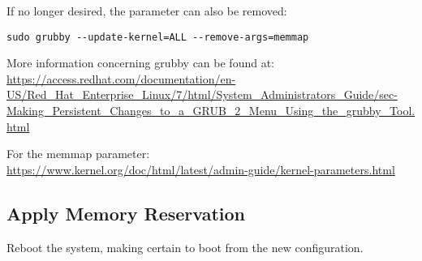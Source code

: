 \begin{flushleft}
If no longer desired, the parameter can also be removed:
\begin{lstlisting}
sudo grubby --update-kernel=ALL --remove-args=memmap
\end{lstlisting}

More information concerning grubby can be found at:\\
\url{https://access.redhat.com/documentation/en-US/Red_Hat_Enterprise_Linux/7/html/System_Administrators_Guide/sec-Making_Persistent_Changes_to_a_GRUB_2_Menu_Using_the_grubby_Tool.html}
\bigskip

For the memmap parameter:\\
\url{https://www.kernel.org/doc/html/latest/admin-guide/kernel-parameters.html}

\subsection{Apply Memory Reservation}
Reboot the system, making certain to boot from the new configuration.

\end{flushleft}
